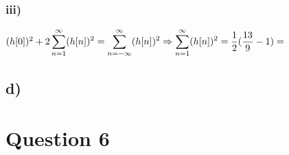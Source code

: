 \documentclass[12pt]{article}
\begin{document}
    \subsubsection*{iii)}
    \begin{math}
    (h[0])^{2} + 2 \displaystyle\sum_{n=1}^{\infty} (h[n])^{2} = \displaystyle\sum_{n=-\infty}^{\infty} (h[n])^{2} \\
    \Rightarrow \displaystyle\sum_{n=1}^{\infty} (h[n])^{2} = \frac{1}{2} (\frac{13}{9} - 1) = 
    \end{math}
    \subsection*{d)}
    \section*{Question 6}
\end{document}
